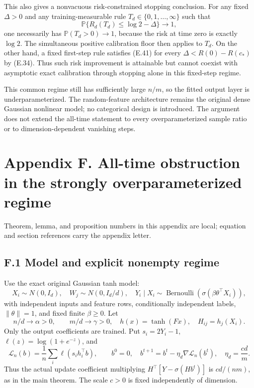\documentclass[
  11pt,
  a4paper,
]{article}
\begin{document}
This also gives a nonvacuous risk-constrained stopping conclusion. For
any fixed \(\Delta>0\) and any training-measurable rule
\(T_d\in\{0,1,\ldots,\infty\}\) such that \[
\mathbb P\{R_d(T_d)\le\log2-\Delta\}\longrightarrow1,
\tag{E.41}
\] one necessarily has \(\mathbb P(T_d>0)\to1\), because the risk at
time zero is exactly \(\log2\). The simultaneous positive calibration
floor then applies to \(T_d\). On the other hand, a fixed first-step
rule satisfies (E.41) for every \(\Delta<R(0)-R(c_*)\) by (E.34). Thus
such risk improvement is attainable but cannot coexist with asymptotic
exact calibration through stopping alone in this fixed-step regime.

This common regime still has sufficiently large \(n/m\), so the fitted
output layer is underparameterized. The random-feature architecture
remains the original dense Gaussian nonlinear model; no categorical
design is introduced. The argument does not extend the all-time
statement to every overparameterized sample ratio or to
dimension-dependent vanishing steps.

\clearpage

\hypertarget{appendix-f.-all-time-obstruction-in-the-strongly-overparameterized-regime}{%
\section{Appendix F. All-time obstruction in the strongly
overparameterized
regime}\label{appendix-f.-all-time-obstruction-in-the-strongly-overparameterized-regime}}

Theorem, lemma, and proposition numbers in this appendix are local;
equation and section references carry the appendix letter.

\hypertarget{f.1-model-and-explicit-nonempty-regime}{%
\subsection{F.1 Model and explicit nonempty
regime}\label{f.1-model-and-explicit-nonempty-regime}}

Use the exact original Gaussian tanh model: \[
X_i\sim N(0,I_d),\quad W_j\sim N(0,I_d/d),\quad
Y_i\mid X_i\sim\operatorname{Bernoulli}(\sigma(\beta\theta^\top X_i)),
\] with independent inputs and feature rows, conditionally independent
labels, \(\|\theta\|=1\), and fixed finite \(\beta\ge0\). Let \[
n/d\to\alpha>0,\qquad m/d\to\gamma>0,\quad
h(x)=\tanh(Fx),\quad H_{ij}=h_j(X_i).
\] Only the output coefficients are trained. Put \(s_i=2Y_i-1\),
\(\ell(z)=\log(1+e^{-z})\), and \[
\mathcal L_n(b)=\frac1n\sum_i\ell(s_i h_i^\top b),\qquad
b^0=0,\quad b^{t+1}=b^t-\eta_d\nabla\mathcal L_n(b^t),
\quad \eta_d=\frac{cd}{m}.
\tag{F.1.1}
\] Thus the actual update coefficient multiplying
\(H^\top[Y-\sigma(Hb^t)]\) is \(cd/(nm)\), as in the main theorem. The
scale \(c>0\) is fixed independently of dimension.
\end{document}

